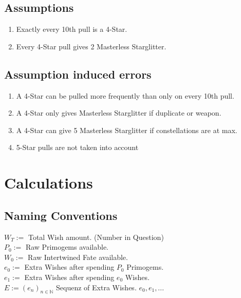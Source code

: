 \documentclass[11pt, a4paper]{article}
\begin{document}
\subsection{Assumptions}
\begin{enumerate}
    \item Exactly every 10th pull is a 4-Star.
    \item Every 4-Star pull gives 2 Masterless Starglitter.
\end{enumerate}
\subsection{Assumption induced errors}
\begin{enumerate}
\item A 4-Star can be pulled more frequently than only on every 10th pull.
\item A 4-Star only gives Masterless Starglitter if duplicate or weapon.
\item A 4-Star can give 5 Masterless Starglitter if constellations are at max.
\item 5-Star pulls are not taken into account 
\end{enumerate}
\newpage

\section{Calculations}
\subsection{Naming Conventions}
$W_T:=$ Total Wish amount. (Number in Question)\\
$P_0:=$ Raw Primogems available.\\
$W_0:=$ Raw Intertwined Fate available.\\
$e_0:=$ Extra Wishes after spending $P_0$ Primogems.\\
$e_1:=$ Extra Wishes after spending $e_0$ Wishes.\\
$E:=(e_n)_{n \in \mathbb{N}}$ Sequenz of Extra Wishes. $e_0, e_1,...$ \\
\\
\end{document}
